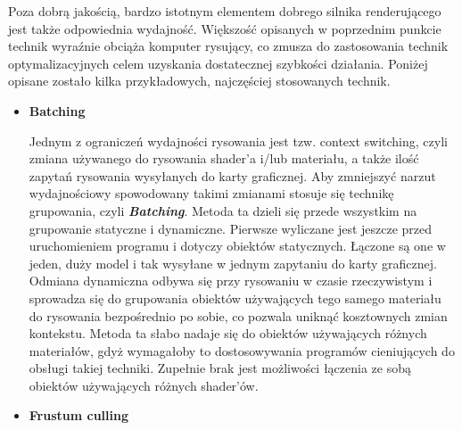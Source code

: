 Poza dobrą jakością, bardzo istotnym elementem dobrego silnika renderującego jest także odpowiednia wydajność. Większość opisanych w poprzednim punkcie technik wyraźnie obciąża komputer rysujący, co zmusza do zastosowania technik optymalizacyjnych celem uzyskania dostatecznej szybkości działania. Poniżej opisane zostało kilka przykładowych, najczęściej stosowanych technik.

\begin{itemize}
	\item \textbf{Batching}

	Jednym z ograniczeń wydajności rysowania jest tzw. context switching, czyli zmiana używanego do rysowania shader'a i/lub materiału, a także ilość zapytań rysowania wysyłanych do karty graficznej. Aby zmniejszyć narzut wydajnościowy spowodowany takimi zmianami stosuje się technikę grupowania, czyli \emph{\textbf{Batching}}.
	Metoda ta dzieli się przede wszystkim na grupowanie statyczne i dynamiczne. Pierwsze wyliczane jest jeszcze przed uruchomieniem programu i dotyczy obiektów statycznych. Łączone są one w jeden, duży model i tak wysyłane w jednym zapytaniu do karty graficznej. Odmiana dynamiczna odbywa się przy rysowaniu w czasie rzeczywistym i sprowadza się do grupowania obiektów używających tego samego materiału do rysowania bezpośrednio po sobie, co pozwala uniknąć kosztownych zmian kontekstu. Metoda ta słabo nadaje się do obiektów używających różnych materiałów, gdyż wymagałoby to dostosowywania programów cieniujących do obsługi takiej techniki. Zupełnie brak jest możliwości łączenia ze sobą obiektów używających różnych shader'ów.

	\item \textbf{Frustum culling}


\end{itemize}
